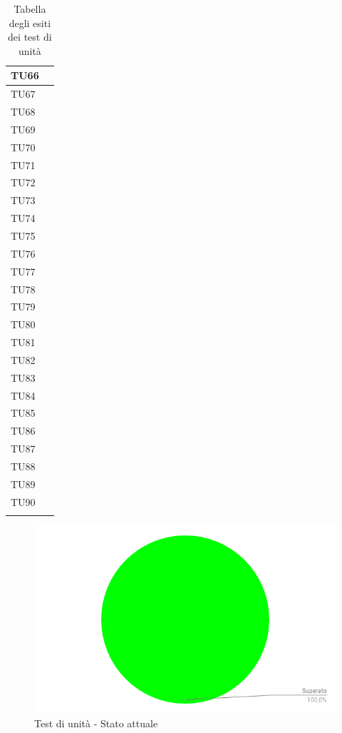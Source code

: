 \begin{longtable}{ | >{\centering\arraybackslash}m{5cm} | >{\centering\arraybackslash}m{5cm} | }
				TU66 	&	\done{} 	\\ \hline
				TU67	&	\done{}	\\ \hline
				TU68 	&	\done{}	\\ \hline
				TU69 	&	\done{}	\\ \hline
				TU70	&	\done{}	\\ \hline

				TU71 	&	\done{} 	\\ \hline
				TU72	&	\done{}	\\ \hline

				TU73 	&	\done{} 	\\ \hline
				TU74	&	\done{}	\\ \hline

				TU75 	&	\done{}	\\ \hline
				TU76	&	\done{}	\\ \hline

				TU77 	&	\done{} 	\\ \hline
				TU78	&	\done{}	\\ \hline
				TU79 	&	\done{} 	\\ \hline
				TU80	&	\done{}	\\ \hline
				TU81 	&	\done{}	\\ \hline
				TU82	&	\done{}	\\ \hline

				TU83 	&	\done{} 	\\ \hline
				TU84	&	\done{}	\\ \hline
				TU85 	&	\done{} 	\\ \hline
				TU86	&	\done{}	\\ \hline
				TU87 	&	\done{}	\\ \hline
				TU88	&	\done{}	\\ \hline

				TU89 	&	\done{}	\\ \hline
				TU90	&	\done{}	\\ \hline

			\caption[Esiti test di unità]{Tabella degli esiti dei test di unità}

			\end{longtable}

			
			\begin{figure}[H]{\textwidth}
  				\centering
  				\includegraphics[width=0.7\linewidth]{./img/Test/testUnita.png}
	  			\caption{Test di unità - Stato attuale}
			\end{figure}
			
